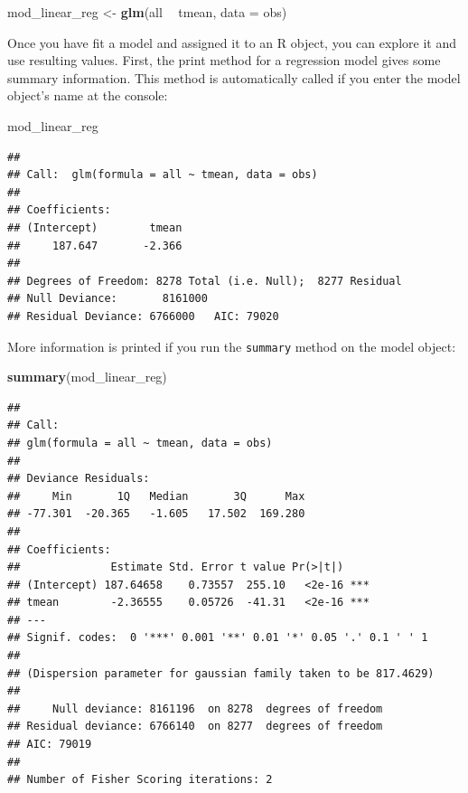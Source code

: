 \documentclass[
]{book}
\newenvironment{Shaded}{\begin{snugshade}}{\end{snugshade}}
\newcommand{\DataTypeTok}[1]{\textcolor[rgb]{0.13,0.29,0.53}{#1}}
\newcommand{\KeywordTok}[1]{\textcolor[rgb]{0.13,0.29,0.53}{\textbf{#1}}}
\newcommand{\NormalTok}[1]{#1}
\newcommand{\OperatorTok}[1]{\textcolor[rgb]{0.81,0.36,0.00}{\textbf{#1}}}
\newcommand{\StringTok}[1]{\textcolor[rgb]{0.31,0.60,0.02}{#1}}
\begin{document}
\begin{Shaded}
\begin{Highlighting}[]
\NormalTok{mod_linear_reg <-}\StringTok{ }\KeywordTok{glm}\NormalTok{(all }\OperatorTok{~}\StringTok{ }\NormalTok{tmean, }\DataTypeTok{data =}\NormalTok{ obs)}
\end{Highlighting}
\end{Shaded}

Once you have fit a model and assigned it to an R object, you can explore it
and use resulting values. First, the print method for a regression model
gives some summary information. This method is automatically called if you
enter the model object's name at the console:

\begin{Shaded}
\begin{Highlighting}[]
\NormalTok{mod_linear_reg}
\end{Highlighting}
\end{Shaded}

\begin{verbatim}
## 
## Call:  glm(formula = all ~ tmean, data = obs)
## 
## Coefficients:
## (Intercept)        tmean  
##     187.647       -2.366  
## 
## Degrees of Freedom: 8278 Total (i.e. Null);  8277 Residual
## Null Deviance:       8161000 
## Residual Deviance: 6766000   AIC: 79020
\end{verbatim}

More information is printed if you run the \texttt{summary} method on the model
object:

\begin{Shaded}
\begin{Highlighting}[]
\KeywordTok{summary}\NormalTok{(mod_linear_reg)}
\end{Highlighting}
\end{Shaded}

\begin{verbatim}
## 
## Call:
## glm(formula = all ~ tmean, data = obs)
## 
## Deviance Residuals: 
##     Min       1Q   Median       3Q      Max  
## -77.301  -20.365   -1.605   17.502  169.280  
## 
## Coefficients:
##              Estimate Std. Error t value Pr(>|t|)    
## (Intercept) 187.64658    0.73557  255.10   <2e-16 ***
## tmean        -2.36555    0.05726  -41.31   <2e-16 ***
## ---
## Signif. codes:  0 '***' 0.001 '**' 0.01 '*' 0.05 '.' 0.1 ' ' 1
## 
## (Dispersion parameter for gaussian family taken to be 817.4629)
## 
##     Null deviance: 8161196  on 8278  degrees of freedom
## Residual deviance: 6766140  on 8277  degrees of freedom
## AIC: 79019
## 
## Number of Fisher Scoring iterations: 2
\end{verbatim}
\end{document}
